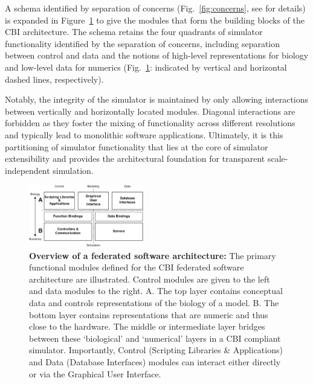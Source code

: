 \documentclass[11pt,3p,twocolumn]{JMN}
\begin{document}
A schema identified by separation of concerns (Fig.~\ref{fig:concerns}, see \cite{cornelis12} for details) is expanded in Figure~\ref{fig:cbi-architecture-simple} to give the modules that form the building blocks of the CBI architecture.  The schema retains the four quadrants of simulator functionality identified by the separation of concerns, including separation between control and data  and the notions of high-level representations for biology and low-level data for numerics (Fig.~\ref{fig:cbi-architecture-simple}: indicated by vertical and horizontal dashed lines, respectively).

Notably, the integrity of the simulator is maintained by only allowing interactions between vertically and horizontally located modules. Diagonal interactions are forbidden as they foster the mixing of functionality across different resolutions and typically lead to monolithic software applications. Ultimately, it is this partitioning of simulator functionality that lies at the core of simulator extensibility and provides the architectural foundation for transparent scale-independent simulation.

\begin{figure}[ht]
\begin{center}
\includegraphics[width=0.45\textwidth]{figures/cbi-architecture-simple.eps}
\end{center}
\caption{ \small{\bf Overview of a federated software architecture:}
  The primary functional modules defined for the CBI federated software architecture are illustrated.  Control modules are given to the left and data modules to the right.  A. The top layer contains conceptual data and controls representations of the biology of a model. B. The bottom layer contains representations that are
  numeric and thus close to the hardware.  The middle or intermediate layer bridges between these `biological' and `numerical' layers in a CBI compliant simulator. Importantly, Control (Scripting Libraries \& Applications) and Data (Database Interfaces) modules can interact either directly or via the Graphical User Interface. }
\label{fig:cbi-architecture-simple}
\end{figure}
\end{document}
